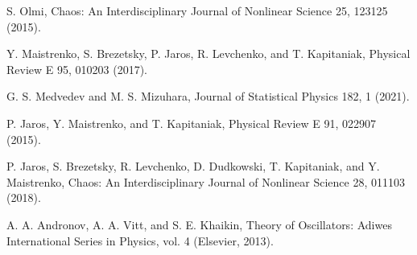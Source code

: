 \documentclass[a4paper,12pt, titlepage]{report} %
\theoremstyle{plain}
\begin{document}
\begin{thebibliography}{10}
    S. Olmi, Chaos: An Interdisciplinary Journal of Nonlinear Science 25, 123125 (2015).

    Y. Maistrenko, S. Brezetsky, P. Jaros, R. Levchenko, and T. Kapitaniak, Physical Review E 95, 010203 (2017).

    G. S. Medvedev and M. S. Mizuhara, Journal of Statistical Physics 182, 1 (2021).

    P. Jaros, Y. Maistrenko, and T. Kapitaniak, Physical Review E 91, 022907 (2015).

    P. Jaros, S. Brezetsky, R. Levchenko, D. Dudkowski, T. Kapitaniak, and Y. Maistrenko, Chaos: An Interdisciplinary Journal of Nonlinear Science 28, 011103 (2018).

    A. A. Andronov, A. A. Vitt, and S. E. Khaikin, Theory of Oscillators: Adiwes International Series in Physics, vol. 4 (Elsevier, 2013).

  \end{thebibliography}
\end{document}

